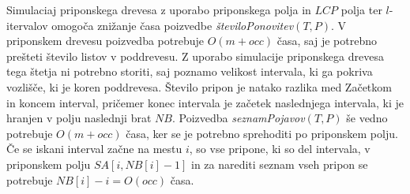 Simulaciaj priponskega drevesa z uporabo priponskega polja in $LCP$ polja ter $l$-itervalov omogoča znižanje časa poizvedbe \textit{številoPonovitev}$(T,P)$. V priponskem drevesu poizvedba potrebuje $O(m+occ)$ časa, saj je potrebno prešteti število listov v poddrevesu. Z uporabo simulacije priponskega drevesa tega štetja ni potrebno storiti, saj poznamo velikost intervala, ki ga pokriva vozlišče, ki je koren poddrevesa. Število pripon je natako razlika med Začetkom in koncem interval, pričemer konec intervala je začetek naslednjega intervala, ki je hranjen v polju naslednji brat $NB$. Poizvedba \textit{seznamPojavov}$(T,P)$ še vedno potrebuje $O(m+occ)$ časa, ker se je potrebno sprehoditi po priponskem polju. Če se iskani interval začne na mestu $i$, so vse pripone, ki so del intervala, v priponskem polju $SA[i, NB[i]-1]$ in za narediti seznam vseh pripon se potrebuje $NB[i]-i=O(occ)$ časa.
